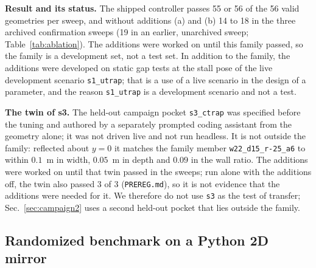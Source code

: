 \documentclass[journal]{IEEEtran}
\begin{document}
\textbf{Result and its status.} The shipped controller passes 55 or 56 of the 56 valid
geometries per sweep, and without additions (a) and (b) 14 to 18 in the three archived
confirmation sweeps (19 in an earlier, unarchived sweep; Table~\ref{tab:ablation}).
The additions were worked on until this family passed, so the family is a development
set, not a test set. In addition to the family, the additions were developed on static gap tests at the stall
pose of the live development scenario \texttt{s1\_utrap}; that is a use of a live scenario in the design
of a parameter, and the reason \texttt{s1\_utrap} is a development scenario and not a test.

\textbf{The twin of s3.} The held-out campaign pocket \texttt{s3\_ctrap} was specified before
the tuning and authored by a separately prompted coding assistant from the geometry alone; it was not driven live and not
run headless. It is not outside the family: reflected about $y=0$ it matches the family member
\texttt{w22\_d15\_r-25\_a6} to within $0.1$~m in width, $0.05$~m in depth and $0.09$ in the
wall ratio. The additions were worked on until that twin passed in the sweeps; run alone
with the additions off, the twin also passed 3 of 3 (\texttt{PREREG.md}), so it is not
evidence that the additions were needed for it. We therefore do not use
\texttt{s3} as the test of transfer; Sec.~\ref{sec:campaign2} uses a second held-out pocket
that lies outside the family.

\subsection{Randomized benchmark on a Python 2D mirror}
\label{sec:bench2d}
\end{document}
